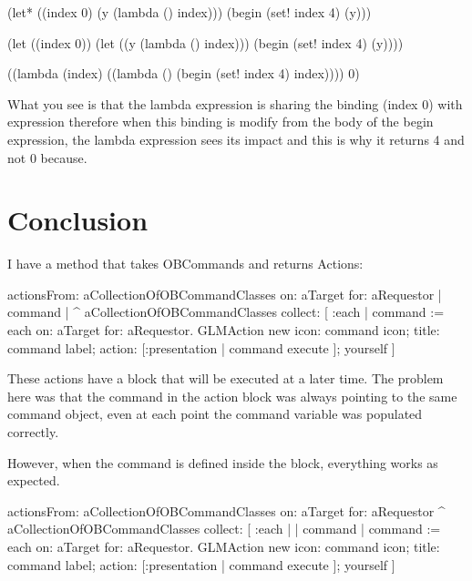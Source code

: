 \documentclass[a4paper,10pt,twoside]{book}
\begin{document}
\begin{code}{}
(let* ((index 0)
       (y (lambda () index)))
  (begin
    (set! index 4)
    (y)))
\end{code}

\begin{code}{}
(let ((index 0))
  (let ((y (lambda () index)))
    (begin
      (set! index 4)
      (y))))
\end{code}

\begin{code}{}
((lambda (index)
   ((lambda () (begin 
                (set! index 4)
                index))))
 0)
\end{code}


What you see is that the lambda expression is sharing the binding (index 0) with expression 
therefore when this binding is modify from the body of the begin expression, the lambda expression sees its impact
and this is why it returns 4 and not 0 because. 


\section{Conclusion}

I have a method that takes OBCommands and returns Actions:

\begin{code}{}
actionsFrom: aCollectionOfOBCommandClasses on: aTarget for: aRequestor
	| command |
	^ aCollectionOfOBCommandClasses collect: [ :each |
		command := each on: aTarget for: aRequestor.
		GLMAction new
			icon: command icon;
			title: command label;
			action: [:presentation | command execute ];
			yourself
		]
	\end{code}

These actions have a block that will be executed at a later time. The  
problem here was that the command in the action block was always  
pointing to the same command object, even at each point the command  
variable was populated correctly.

However, when the command is defined inside the block, everything  
works as expected.

\begin{code}{}
actionsFrom: aCollectionOfOBCommandClasses on: aTarget for: aRequestor
	^ aCollectionOfOBCommandClasses collect: [ :each |
		| command |
		command := each on: aTarget for: aRequestor.
		GLMAction new
			icon: command icon;
			title: command label;
			action: [:presentation | command execute ];
			yourself
		]
	\end{code}
\end{document}
